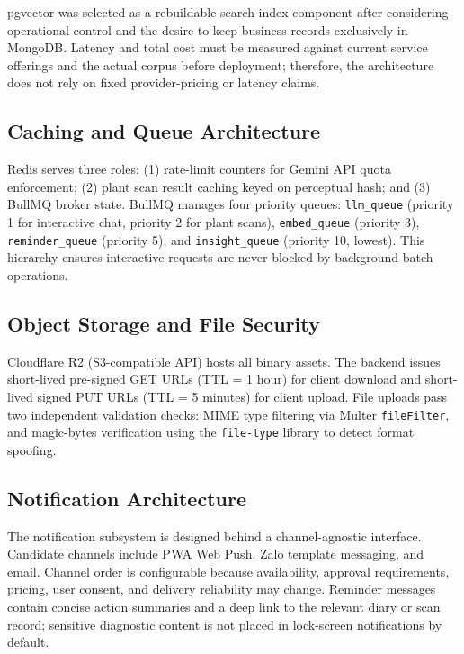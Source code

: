 \documentclass[conference]{IEEEtran}
\begin{document}
pgvector was selected as a rebuildable search-index component after considering operational control and the desire to keep business records exclusively in MongoDB. Latency and total cost must be measured against current service offerings and the actual corpus before deployment; therefore, the architecture does not rely on fixed provider-pricing or latency claims.

\subsection{Caching and Queue Architecture}

Redis serves three roles: (1) rate-limit counters for Gemini API quota enforcement; (2) plant scan result caching keyed on perceptual hash; and (3) BullMQ broker state. BullMQ manages four priority queues: \texttt{llm\_queue} (priority 1 for interactive chat, priority 2 for plant scans), \texttt{embed\_queue} (priority 3), \texttt{reminder\_queue} (priority 5), and \texttt{insight\_queue} (priority 10, lowest). This hierarchy ensures interactive requests are never blocked by background batch operations.

\subsection{Object Storage and File Security}

Cloudflare R2 (S3-compatible API) hosts all binary assets. The backend issues short-lived pre-signed GET URLs (TTL = 1 hour) for client download and short-lived signed PUT URLs (TTL = 5 minutes) for client upload. File uploads pass two independent validation checks: MIME type filtering via Multer \texttt{fileFilter}, and magic-bytes verification using the \texttt{file-type} library to detect format spoofing.

\subsection{Notification Architecture}

The notification subsystem is designed behind a channel-agnostic interface. Candidate channels include PWA Web Push, Zalo template messaging, and email. Channel order is configurable because availability, approval requirements, pricing, user consent, and delivery reliability may change. Reminder messages contain concise action summaries and a deep link to the relevant diary or scan record; sensitive diagnostic content is not placed in lock-screen notifications by default.
\end{document}
